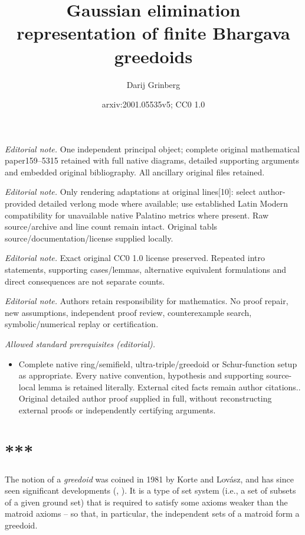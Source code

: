 \documentclass[numbers=enddot,12pt,final,onecolumn,notitlepage]{scrartcl}%
\title{Gaussian elimination representation of finite Bhargava greedoids}
\author{Darij Grinberg}
\date{arxiv:2001.05535v5; CC0 1.0}
\theoremstyle{definition}
\theoremstyle{plainsl}
\begin{document}
\maketitle
\noindent\textit{Editorial note.} One independent principal object; complete original mathematical paper159--5315 retained with full native diagrams, detailed supporting arguments and embedded original bibliography. All ancillary original files retained.\par\medskip
\noindent\textit{Editorial note.} Only rendering adaptations at original lines[10]: select author-provided detailed verlong mode where available; use established Latin Modern compatibility for unavailable native Palatino metrics where present. Raw source/archive and line count remain intact. Original tabls source/documentation/license supplied locally.\par\medskip
\noindent\textit{Editorial note.} Exact original CC0 1.0 license preserved. Repeated intro statements, supporting cases/lemmas, alternative equivalent formulations and direct consequences are not separate counts.\par\medskip
\noindent\textit{Editorial note.} Authors retain responsibility for mathematics. No proof repair, new assumptions, independent proof review, counterexample search, symbolic/numerical replay or certification.\par\medskip
\noindent\textit{Allowed standard prerequisites (editorial).}\begin{itemize}
\item Complete native ring/semifield, ultra-triple/greedoid or Schur-function setup as appropriate. Every native convention, hypothesis and supporting source-local lemma is retained literally. External cited facts remain author citations.. Original detailed author proof supplied in full, without reconstructing external proofs or independently certifying arguments.
\end{itemize}\medskip
\section*{***}

The notion of a \emph{greedoid} was coined in 1981 by Korte and Lov\'{a}sz,
and has since seen significant developments (\cite{KoLoSc91}, \cite{BjoZie92}%
). It is a type of set system (i.e., a set of subsets of a given ground set)
that is required to satisfy some axioms weaker than the matroid axioms -- so
that, in particular, the independent sets of a matroid form a greedoid.
\end{document}
